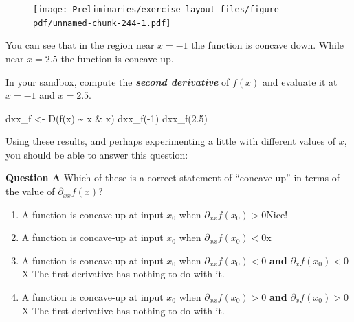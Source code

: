 \documentclass[
  letterpaper,
  DIV=11,
  numbers=noendperiod,
  oneside]{article}
\newenvironment{Shaded}{\begin{snugshade}}{\end{snugshade}}
\newcommand{\DecValTok}[1]{\textcolor[rgb]{0.68,0.00,0.00}{#1}}
\newcommand{\FloatTok}[1]{\textcolor[rgb]{0.68,0.00,0.00}{#1}}
\newcommand{\FunctionTok}[1]{\textcolor[rgb]{0.28,0.35,0.67}{#1}}
\newcommand{\NormalTok}[1]{\textcolor[rgb]{0.00,0.23,0.31}{#1}}
\newcommand{\OtherTok}[1]{\textcolor[rgb]{0.00,0.23,0.31}{#1}}
\newcommand{\SpecialCharTok}[1]{\textcolor[rgb]{0.37,0.37,0.37}{#1}}
\providecommand{\tightlist}{%
  \setlength{\itemsep}{0pt}\setlength{\parskip}{0pt}}\usepackage{longtable,booktabs,array}
\begin{document}
\begin{multicols}{2}
\begin{figure}[H]

{\centering \texttt{[image: Preliminaries/exercise-layout\_files/figure-pdf/unnamed-chunk-244-1.pdf]}

}

\end{figure}

You can see that in the region near \(x = -1\) the function is concave
down. While near \(x=2.5\) the function is concave up.

In your sandbox, compute the \textbf{\emph{second derivative}} of
\(f(x)\) and evaluate it at \(x=-1\) and \(x=2.5\).

\begin{Shaded}
\begin{Highlighting}[]
\NormalTok{dxx\_f }\OtherTok{\textless{}{-}} \FunctionTok{D}\NormalTok{(}\FunctionTok{f}\NormalTok{(x) }\SpecialCharTok{\textasciitilde{}}\NormalTok{ x }\SpecialCharTok{\&}\NormalTok{ x)}
\FunctionTok{dxx\_f}\NormalTok{(}\SpecialCharTok{{-}}\DecValTok{1}\NormalTok{)}
\FunctionTok{dxx\_f}\NormalTok{(}\FloatTok{2.5}\NormalTok{)}
\end{Highlighting}
\end{Shaded}

Using these results, and perhaps experimenting a little with different
values of \(x\), you should be able to answer this question:

\textbf{Question A} Which of these is a correct statement of ``concave
up'' in terms of the value of \(\partial_{xx} f(x)\)?

\begin{enumerate}
\def\labelenumi{\roman{enumi}.}
\tightlist
\item
  {A function is concave-up at input \(x_0\) when
  \(\partial_{xx} f(x_0) > 0\){Nice!~}}\\
\item
  {A function is concave-up at input \(x_0\) when
  \(\partial_{xx} f(x_0) < 0\){x}}\\
\item
  {A function is concave-up at input \(x_0\) when
  \(\partial_{xx} f(x_0) < 0\) \textbf{and} \(\partial_x f(x_0) < 0\){︎X
  The first derivative has nothing to do with it.}}\\
\item
  {A function is concave-up at input \(x_0\) when
  \(\partial_{xx} f(x_0) > 0\) \textbf{and} \(\partial_x f(x_0) > 0\){︎X
  The first derivative has nothing to do with it.}}
\end{enumerate}


\end{multicols}
\end{document}
